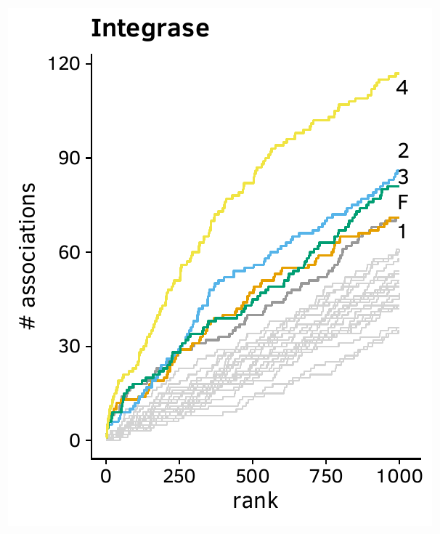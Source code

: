 \documentclass[a4paper,11pt]{article}
\begin{document}
\begin{figure}[H]
    \begin{minipage}{.49\textwidth}
      \includegraphics[width=\linewidth]{plots/comparison_plots/arevir/integrase_new_map.pdf}
    \end{minipage}%
    \begin{minipage}{.49\textwidth}

\end{minipage}
\end{figure}
\end{document}
